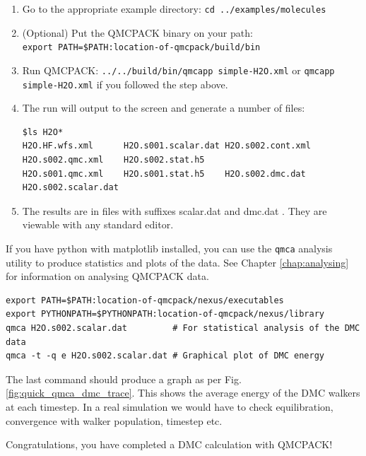 \begin{enumerate}
\item Go to the appropriate example directory: \texttt{cd
    ../examples/molecules}
\item (Optional) Put the QMCPACK binary on your path:\\ \texttt{export PATH=\$PATH:location-of-qmcpack/build/bin}
\item Run QMCPACK: \texttt{../../build/bin/qmcapp simple-H2O.xml} or
  \texttt{qmcapp simple-H2O.xml} if you followed the step above.
\item The run will output to the screen and generate a number of files:
\begin{verbatim}
$ls H2O*
H2O.HF.wfs.xml      H2O.s001.scalar.dat H2O.s002.cont.xml   H2O.s002.qmc.xml    H2O.s002.stat.h5
H2O.s001.qmc.xml    H2O.s001.stat.h5    H2O.s002.dmc.dat    H2O.s002.scalar.dat
\end{verbatim}
\item The results are in files with suffixes scalar.dat and dmc.dat . They are viewable with any standard editor.
\end{enumerate}

If you have python with matplotlib installed, you can use the
\texttt{qmca} analysis utility to produce statistics and plots of the
data. See Chapter \ref{chap:analysing} for information on analysing
QMCPACK data.
\begin{verbatim}
export PATH=$PATH:location-of-qmcpack/nexus/executables 
export PYTHONPATH=$PYTHONPATH:location-of-qmcpack/nexus/library
qmca H2O.s002.scalar.dat         # For statistical analysis of the DMC data
qmca -t -q e H2O.s002.scalar.dat # Graphical plot of DMC energy
\end{verbatim}

The last command should produce a graph as per
Fig. \ref{fig:quick_qmca_dmc_trace}. This shows the average energy of
the DMC walkers at each timestep. In a real simulation we would have
to check equilibration, convergence with walker population, timestep etc.

Congratulations, you have completed a DMC calculation with QMCPACK!


